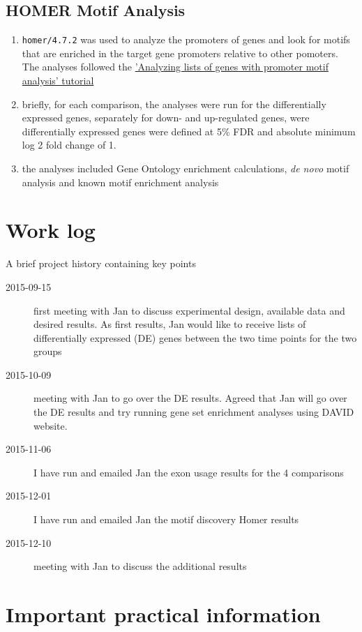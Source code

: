 \documentclass[12pt]{article}
\newcommand{\homer}{\texttt{homer/4.7.2}}
\begin{document}
\subsection{HOMER Motif Analysis}
\begin{enumerate}
  \item {\homer} was used to analyze the promoters of genes and look for motifs that are enriched in the target gene promoters relative to other pomoters. The analyses followed the \href{http://homer.salk.edu/homer/motif/index.html}{'Analyzing lists of genes with promoter motif analysis' tutorial}
  \item briefly, for each comparison, the analyses were run for the differentially expressed genes, separately for down- and up-regulated genes, were differentially expressed genes were defined at 5\% FDR and absolute minimum log 2 fold change of 1. 
  \item the analyses included Gene Ontology enrichment calculations, \textit{de novo} motif analysis and known motif enrichment analysis
\end{enumerate}


\section{Work log}
A brief project history containing key points
\begin{description}
\item[2015-09-15] first meeting with Jan to discuss experimental design, available data and desired results.	As first results, Jan would like to receive lists of differentially expressed (DE) genes between the two time points for the two groups
\item[2015-10-09] meeting with Jan to go over the DE results. Agreed that Jan will go over the DE results and try running gene set enrichment analyses using DAVID website.
\item[2015-11-06] I have run and emailed Jan the exon usage results for the 4 comparisons
\item[2015-12-01] I have run and emailed Jan the motif discovery Homer results
\item[2015-12-10] meeting with Jan to discuss the additional results
\end{description}

\section{Important practical information}
\end{document}

